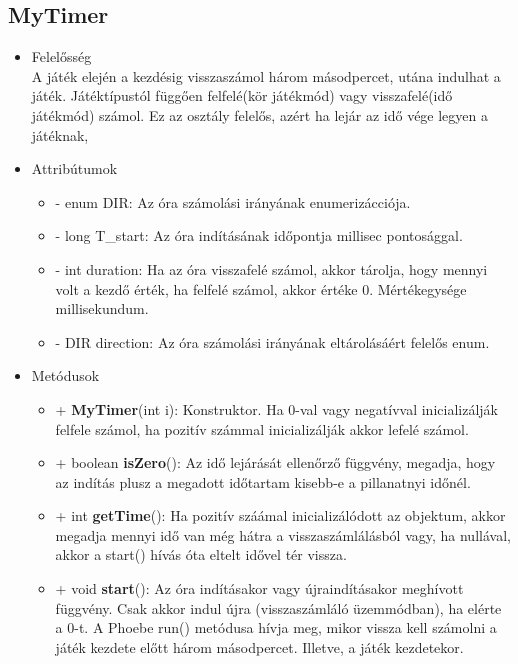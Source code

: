\subsection{MyTimer}
\begin{itemize}
\item Felelősség\\
A játék elején a kezdésig visszaszámol három másodpercet, utána indulhat a játék. Játéktípustól függően felfelé(kör játékmód) vagy visszafelé(idő játékmód) számol. Ez az osztály felelős, azért ha lejár az idő vége legyen a játéknak,
\item Attribútumok
    \begin{itemize}
        \item - enum DIR: Az óra számolási irányának enumerizácciója.
        \item - long T\_start: Az óra indításának időpontja millisec pontosággal.
	    \item - int duration: Ha az óra visszafelé számol, akkor tárolja, hogy mennyi volt a kezdő érték, ha felfelé számol, akkor értéke 0. Mértékegysége millisekundum.
	    \item - DIR direction: Az óra számolási irányának eltárolásáért felelős enum.
    \end{itemize}
\item Metódusok
	\begin{itemize}
		\item + \textbf{MyTimer}(int i): Konstruktor. Ha 0-val vagy negatívval inicializálják felfele számol, ha pozitív számmal inicializálják akkor lefelé számol.
		\item + boolean \textbf{isZero}(): Az idő lejárását ellenőrző függvény, megadja, hogy az indítás plusz a megadott időtartam kisebb-e a pillanatnyi időnél.
		\item + int \textbf{getTime}():  Ha pozitív száámal inicializálódott az objektum, akkor megadja mennyi idő van még hátra a visszaszámlálásból vagy, ha nullával, akkor a start() hívás óta eltelt idővel tér vissza.
		\item + void \textbf{start}(): Az óra indításakor vagy újraindításakor meghívott függvény. Csak akkor indul újra (visszaszámláló üzemmódban), ha elérte a 0-t. A Phoebe run() metódusa hívja meg, mikor vissza kell számolni a játék kezdete előtt három másodpercet. Illetve, a játék kezdetekor.
	\end{itemize}
\end{itemize}

